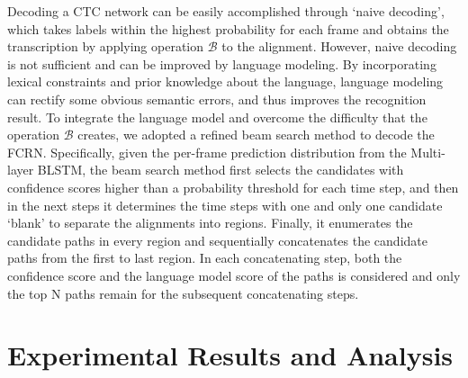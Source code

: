\documentclass[10pt,conference,a4paper]{IEEEtran}
\begin{document}
Decoding a CTC network can be easily accomplished through `naive decoding'\cite{graves2012supervised}, which takes labels within the highest probability for each frame and obtains the transcription by applying operation $\mathscr{B}$ to the alignment.
However, naive decoding is not sufficient and can be improved by language modeling.
By incorporating lexical constraints and prior knowledge about the language, language modeling can rectify some obvious semantic errors, and thus improves the recognition result.
To integrate the language model and overcome the difficulty that the operation $\mathscr{B}$ creates, we adopted a refined beam search method to decode the FCRN.
Specifically, given the per-frame prediction distribution from the Multi-layer BLSTM,
the beam search method first selects the candidates with confidence scores higher than a probability threshold for each time step, and then in the next steps it determines the time steps with one and only one candidate `blank' to separate the alignments into regions.
Finally, it enumerates the candidate paths in every region and sequentially concatenates the candidate paths from the first to last region.
In each concatenating step, both the confidence score and the language model score of the paths is considered and only the top N paths remain for the subsequent concatenating steps.




\section{Experimental Results and Analysis}
\end{document}
